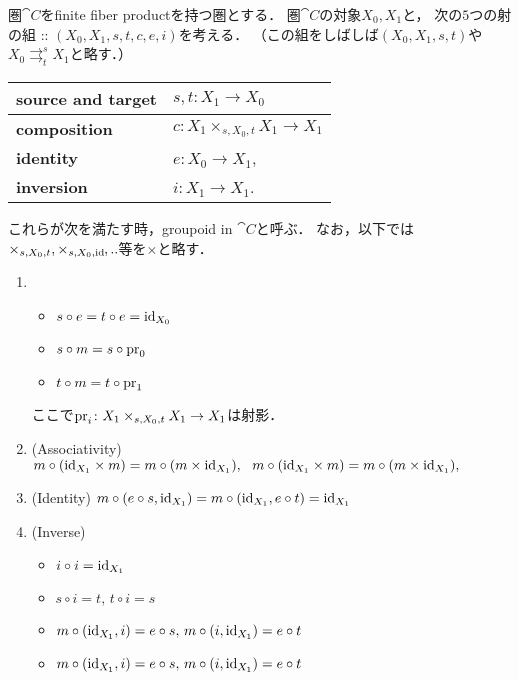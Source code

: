 \documentclass[a4paper, dvipdfmx]{jsarticle}
\newcommand{\parto}[2]{\mathrel{\mathop{\rightrightarrows}^{#1}_{#2}}}
\begin{document}
\begin{Def}
    圏$\cat{C}$をfinite fiber productを持つ圏とする．
    圏$\cat{C}$の対象$X_0, X_1$と，
    次の$5$つの射の組 :: $(X_0,X_1, s,t,c,e,i)$を考える．
    （この組をしばしば$(X_0,X_1,s,t)$や$X_0 \parto{s}{t} X_1$と略す．）
    \begin{center}
    \begin{tabular}{ll}
        \textbf{source and target} & $s,t \colon X_1 \to X_0$ \\ \hline
        \textbf{composition}       & $c \colon X_1 \times_{s,X_0,t} X_1 \to X_1$ \\ \hline
        \textbf{identity}          & $e \colon X_0 \to X_1$, \\ \hline
        \textbf{inversion}         & $i \colon X_1 \to X_1$.
    \end{tabular}
    \end{center}

    これらが次を満たす時，groupoid in $\cat{C}$と呼ぶ．
    なお，以下では$\times_{s,X_0, t}, \times_{s, X_0, \id},..$等を$\times$と略す．
    \begin{enumerate}[label=(\Alph*)]
    \item 
        \begin{itemize}
            \item $s\circ e=t\circ e=\id[X_0]$
            \item $s\circ m=s\circ \pr_{0}$
            \item $t\circ m=t\circ \pr_{1}$
        \end{itemize}
        ここで$\pr_i \colon X_1\times _{s,X_0,t} X_1\to X_1$は射影．
    \item
        (Associativity)
        $m\circ (\id[X_1]\times m)=m\circ (m\times \id[X_1]),\ \ 
        m\circ (\id[X_1]\times m)=m\circ (m\times \id[X_1]),$
    \item
        (Identity)
        $m\circ (e\circ s,\id[X_1])=m\circ (\id[X_1],e\circ t)=\id[X_1]$
    \item
        (Inverse)
        \begin{itemize}
            \item $i\circ i=\id[X_1]$
            \item $s\circ i=t,\,t\circ i=s$
            \item $m\circ (\id[X_1],i)=e\circ s,\,m\circ (i,\id[X_1])=e\circ t$
            \item $m\circ (\id[X_1],i)=e\circ s,\,m\circ (i,\id[X_1])=e\circ t$
        \end{itemize}
    \end{enumerate}
\end{Def}
\end{document}
